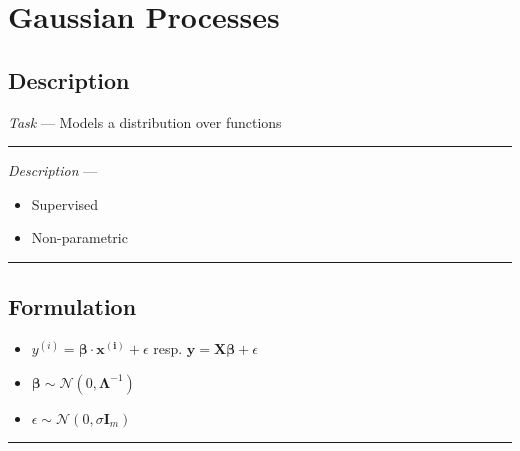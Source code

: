 \section{Gaussian Processes}
\subsection*{Description}
\emph{Task} --- Models a distribution over functions

{\color{lightgray}\hrule height 0.001mm}

\emph{Description} --- 
\begin{itemize}
    \item Supervised
    \item Non-parametric
\end{itemize}

{\color{black}\hrule height 0.001mm}

\subsection*{Formulation}

\begin{itemize}
    \item $y^{(i)} = \boldsymbol{\beta} \cdot \boldsymbol{x^{(i)}} + \epsilon$ resp. $\boldsymbol{y} = \boldsymbol{X}\boldsymbol{\beta} + \epsilon$
    \item $\boldsymbol{\beta} \sim \mathcal{N} (0,\boldsymbol{\Lambda}^{-1})$
    \item $\epsilon \sim \mathcal{N} (0,\sigma \boldsymbol{I}_m)$
\end{itemize}

{\color{black}\hrule height 0.001mm}

